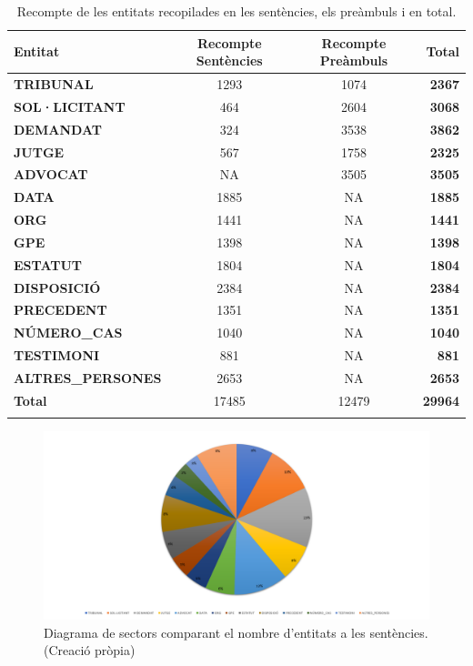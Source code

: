 \begin{table}[H]
    \centering
    \begin{tabular}{lccr}
        \Xhline{2\arrayrulewidth}
        Entitat & Recompte Sentències & Recompte Preàmbuls & Total \\
        \hline
        \textbf{TRIBUNAL} & 1293 & 1074 & \textbf{2367} \\
        \textbf{SOL·LICITANT} & 464 & 2604 & \textbf{3068} \\
        \textbf{DEMANDAT} & 324 & 3538 & \textbf{3862} \\
        \textbf{JUTGE} & 567 & 1758 & \textbf{2325} \\
        \textbf{ADVOCAT} & NA & 3505 & \textbf{3505} \\
        \textbf{DATA} & 1885 & NA & \textbf{1885} \\
        \textbf{ORG} & 1441 & NA & \textbf{1441} \\
        \textbf{GPE} & 1398 & NA & \textbf{1398} \\
        \textbf{ESTATUT} & 1804 & NA & \textbf{1804} \\
        \textbf{DISPOSICIÓ} & 2384 & NA & \textbf{2384} \\
        \textbf{PRECEDENT} & 1351 & NA & \textbf{1351} \\
        \textbf{NÚMERO\_CAS} & 1040 & NA & \textbf{1040} \\
        \textbf{TESTIMONI} & 881 & NA & \textbf{881} \\
        \textbf{ALTRES\_PERSONES} & 2653 & NA & \textbf{2653} \\
        \hline
        \textbf{Total} & 17485 & 12479 & \textbf{29964} \\
        \Xhline{2\arrayrulewidth}
    \end{tabular}
    \caption{Recompte de les entitats recopilades en les sentències, els preàmbuls i en total.}
    \label{tab:recompte_entitats}
\end{table}

\begin{figure}[H]
  \centering
  \includegraphics[width=\textwidth]{formatge_tipus_entitats.png}
  \caption[Diagrama de sectors del nombre d'entitats a les sentències]{Diagrama de sectors comparant el nombre d'entitats a les sentències. \\ (Creació pròpia)}
  \label{fig:diagrama_sectors_tipus_entitats}
\end{figure}

